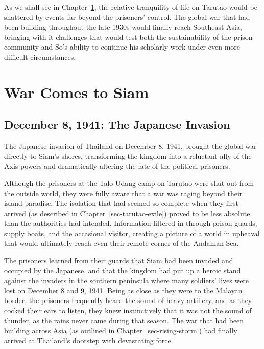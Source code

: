 \documentclass[
  Letterpaper,
]{scrbook}
\begin{document}
As we shall see in Chapter~\ref{sec-war-comes-siam}, the relative
tranquility of life on Tarutao would be shattered by events far beyond
the prisoners' control. The global war that had been building throughout
the late 1930s would finally reach Southeast Asia, bringing with it
challenges that would test both the sustainability of the prison
community and So's ability to continue his scholarly work under even
more difficult circumstances.


\chapter{War Comes to Siam}\label{sec-war-comes-siam}

\section{December 8, 1941: The Japanese
Invasion}\label{december-8-1941-the-japanese-invasion}

The Japanese invasion of Thailand on December 8, 1941, brought the
global war directly to Siam's shores, transforming the kingdom into a
reluctant ally of the Axis powers and dramatically altering the fate of
the political prisoners.

Although the prisoners at the Talo Udang camp on Tarutao were shut out
from the outside world, they were fully aware that a war was raging
beyond their island paradise. The isolation that had seemed so complete
when they first arrived (as described in
Chapter~\ref{sec-tarutao-exile}) proved to be less absolute than the
authorities had intended. Information filtered in through prison guards,
supply boats, and the occasional visitor, creating a picture of a world
in upheaval that would ultimately reach even their remote corner of the
Andaman Sea.

The prisoners learned from their guards that Siam had been invaded and
occupied by the Japanese, and that the kingdom had put up a heroic stand
against the invaders in the southern peninsula where many soldiers'
lives were lost on December 8 and 9, 1941. Being as close as they were
to the Malayan border, the prisoners frequently heard the sound of heavy
artillery, and as they cocked their ears to listen, they knew
instinctively that it was not the sound of thunder, as the rains never
came during that season. The war that had been building across Asia (as
outlined in Chapter~\ref{sec-rising-storm}) had finally arrived at
Thailand's doorstep with devastating force.
\end{document}
